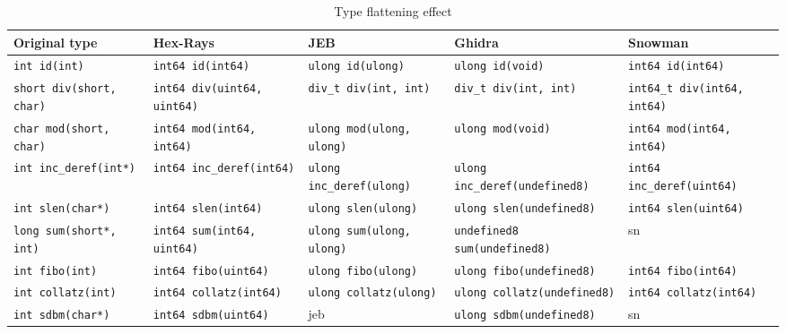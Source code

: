 \documentclass[a4paper]{llncs}
\begin{document}
\begin{table}
	\begin{adjustwidth}{-6.21in}{-5.95in}
		\begin{center}
			\caption{Type flattening effect}\label{flattening}
			\begin{tabular}{|l|l|l|l|l|}
				\hline
				Original type & Hex-Rays & JEB & Ghidra & Snowman \\
				\hline
				\texttt{int id(int)} & \texttt{int64 id(int64)} & \texttt{ulong id(ulong)} &
				\texttt{ulong id(void)} & \texttt{int64 id(int64)} \\
				\hline
				\texttt{short div(short, char)} & \texttt{int64 div(uint64, uint64)} & \texttt{div\_t div(int, int)} &
				\texttt{div\_t div(int, int)} & \texttt{int64\_t div(int64, int64)} \\
				\hline
				\texttt{char mod(short, char)} & \texttt{int64 mod(int64, int64)} & \texttt{ulong mod(ulong, ulong)} &
				\texttt{ulong mod(void)} & \texttt{int64 mod(int64, int64)} \\
				\hline
				\texttt{int inc\_deref(int*)} & \texttt{int64 inc\_deref(int64)} & \texttt{ulong inc\_deref(ulong)} &
				\texttt{ulong inc\_deref(undefined8)} & \texttt{int64 inc\_deref(uint64)} \\
				\hline
				\texttt{int slen(char*)} & \texttt{int64 slen(int64)} & \texttt{ulong slen(ulong)} &
				\texttt{ulong slen(undefined8)} & \texttt{int64 slen(uint64)} \\
				\hline
				\texttt{long sum(short*, int)} & \texttt{int64 sum(int64, uint64)} & \texttt{ulong sum(ulong, ulong)} & \texttt{undefined8 sum(undefined8)} & sn \\
				\hline
				\texttt{int fibo(int)} & \texttt{int64 fibo(uint64)} & \texttt{ulong fibo(ulong)} &
				\texttt{ulong fibo(undefined8)} & \texttt{int64 fibo(int64)} \\
				\hline
				\texttt{int collatz(int)} & \texttt{int64 collatz(int64)} & \texttt{ulong collatz(ulong)} &
				\texttt{ulong collatz(undefined8)} & \texttt{int64 collatz(int64)} \\
				\hline
				\texttt{int sdbm(char*)} & \texttt{int64 sdbm(uint64)} & jeb & \texttt{ulong sdbm(undefined8)} & sn \\
				\hline
			\end{tabular}
		\end{center}
	\end{adjustwidth}
\end{table}
\end{document}
